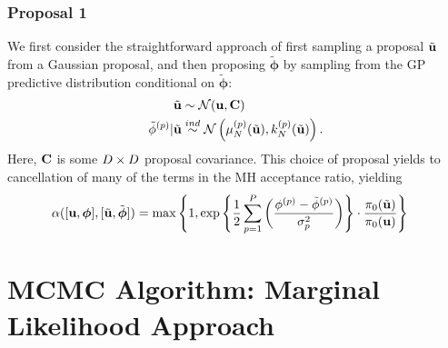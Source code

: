 \documentclass[12pt]{article}
\newcommand{\bphi}{\boldsymbol{\phi}}
\begin{document}
\subsubsection{Proposal 1}
We first consider the straightforward approach of first sampling a proposal $\tilde{\mathbf{u}}$ from a Gaussian proposal, and then proposing $\tilde{\bphi}$ by sampling from the 
GP predictive distribution conditional on $\tilde{\bphi}$: 
\begin{align*}
\tilde{\mathbf{u}} &\sim \mathcal{N}(\mathbf{u}, \mathbf{C}) \\
{\tilde{\phi}}^{(p)}|\tilde{\mathbf{u}} &\overset{ind}{\sim} \mathcal{N}\left(\mu_{N}^{(p)}(\tilde{\mathbf{u}}), k_{N}^{(p)}(\tilde{\mathbf{u}})\right).
\end{align*}
Here, $\mathbf{C}$ is some $D \times D$ proposal covariance. This choice of proposal yields to cancellation of many of the terms in the MH acceptance ratio, yielding
\begin{align*}
\accProbMH([\bpar, \bphi], [\tilde{\bpar}, \tilde{\bphi}]) 
&= \max\left\{1, \exp\left\{\frac{1}{2} \sum_{\objIdx=1}^{\Nobj} \left(\frac{ \indexObj{\phi} - \indexObj{\tilde{\phi}}}{\sdObs^2_{\objIdx}}\right)\right\} \cdot \frac{\priorDens(\tilde{\bpar})}{\priorDens(\bpar)} \right\}
\end{align*}



\section{MCMC Algorithm: Marginal Likelihood Approach}
\end{document}

